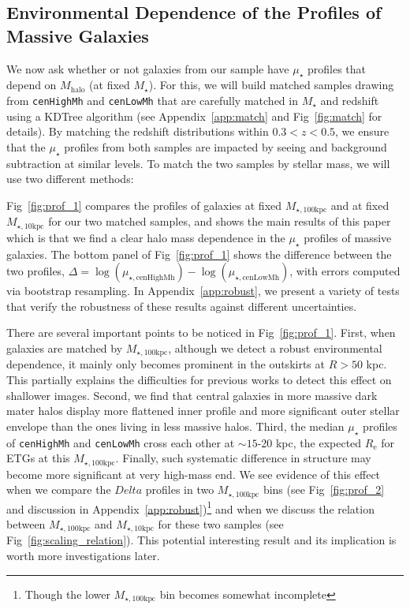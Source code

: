 \documentclass[a4paper,fleqn,usenatbib]{mnras}
\def\rbcg{\texttt{cenHighMh}}
\def\nbcg{\texttt{cenLowMh}}
\def\mstar{{$M_{\star}$}}
\def\mhalo{{$M_{\mathrm{halo}}$}}
\def\minn{{$M_{\star,10\mathrm{kpc}}$}}
\def\mtot{{$M_{\star,100\mathrm{kpc}}$}}
\def\mden{{$\mu_{\star}$}}
\begin{document}
\subsection{Environmental Dependence of the Profiles of Massive Galaxies}
    \label{ssec:sbp_mtot} 
       
    We now ask whether or not galaxies from our sample have \mden{} profiles that 
    depend on \mhalo{} (at fixed \mstar{}). 
    For this, we will build matched samples drawing from \rbcg{} and \nbcg{} that are 
    carefully matched in \mstar{} and redshift using a KDTree algorithm 
    (see Appendix~\ref{app:match} and Fig~\ref{fig:match} for details). 
    By matching the redshift distributions within $0.3 < z < 0.5$, we ensure that the 
    \mden{} profiles from both samples are impacted by seeing and background subtraction 
    at similar levels. 
    To match the two samples by stellar mass, we will use two different methods:

    Fig~\ref{fig:prof_1} compares the profiles of galaxies at fixed \mtot{} and at fixed 
    \minn{} for our two matched samples, and shows the main results of this paper which 
    is that we find a clear halo mass dependence in the \mden{} profiles of massive 
    galaxies. 
    The bottom panel of Fig~\ref{fig:prof_1} shows the difference between the two 
    profiles, $\Delta = \log(\mu_{\star, \mathrm{cenHighMh}}) - 
    \log(\mu_{\star, \mathrm{cenLowMh}})$, 
    with errors computed via bootstrap resampling. 
    In Appendix~\ref{app:robust}, we present a variety of tests that verify the 
    robustness of these results against different uncertainties.
   
    There are several important points to be noticed in Fig~\ref{fig:prof_1}. 
    First, when galaxies are matched by \mtot{}, although we detect a robust 
    environmental dependence, it mainly only becomes prominent in the outskirts 
    at $R>50$ kpc. 
    This partially explains the difficulties for previous works to detect this effect
    on shallower images. 
    Second, we find that central galaxies in more massive dark mater halos display 
    more flattened inner profile and more significant outer stellar envelope than 
    the ones living in less massive halos. 
    Third, the median \mden{} profiles of \rbcg{} and \nbcg{} cross each other 
    at ${\sim} 15$-20 kpc, the expected $R_{\mathrm{e}}$ for ETGs at this \mtot{}. 
    Finally, such systematic difference in structure may become more significant 
    at very high-mass end. 
    We see evidence of this effect when we compare the $Delta$ profiles in two \mtot{} 
    bins (see Fig~\ref{fig:prof_2} and discussion in 
    Appendix~\ref{app:robust})\footnote{Though the lower \mtot{} bin becomes somewhat
    incomplete} and when we discuss the relation between \mtot{} and \minn{} for 
    these two samples (see Fig~\ref{fig:scaling_relation}). 
    This potential interesting result and its implication is worth more investigations 
    later.  
\end{document}
